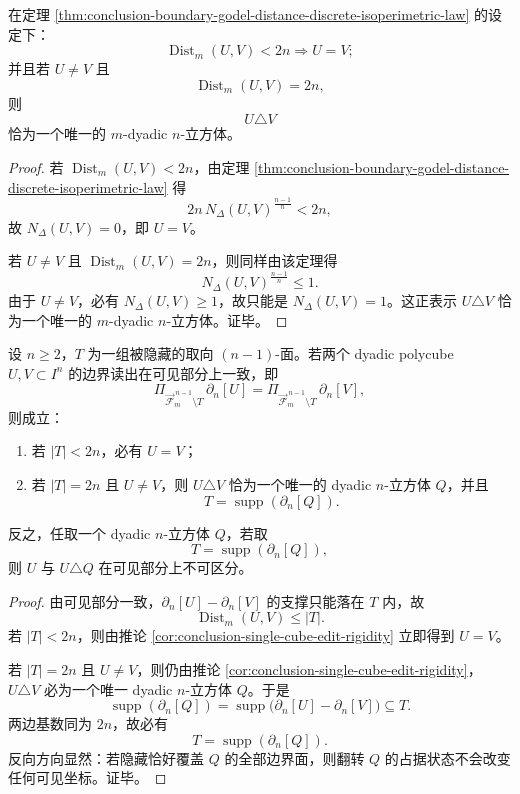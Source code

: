 \begin{corollary}[单立方体编辑刚性]\label{cor:conclusion-single-cube-edit-rigidity}
在定理 \ref{thm:conclusion-boundary-godel-distance-discrete-isoperimetric-law} 的设定下：
\[
\operatorname{Dist}_m(U,V)<2n \Longrightarrow U=V;
\]
并且若 \(U\neq V\) 且
\[
\operatorname{Dist}_m(U,V)=2n,
\]
则
\[
U\triangle V
\]
恰为一个唯一的 \(m\)-dyadic \(n\)-立方体。
\end{corollary}

\begin{proof}
若 \(\operatorname{Dist}_m(U,V)<2n\)，由定理 \ref{thm:conclusion-boundary-godel-distance-discrete-isoperimetric-law} 得
\[
2n\,N_\Delta(U,V)^{\frac{n-1}{n}}<2n,
\]
故 \(N_\Delta(U,V)=0\)，即 \(U=V\)。

若 \(U\neq V\) 且 \(\operatorname{Dist}_m(U,V)=2n\)，则同样由该定理得
\[
N_\Delta(U,V)^{\frac{n-1}{n}}\le 1.
\]
由于 \(U\neq V\)，必有 \(N_\Delta(U,V)\ge 1\)，故只能是 \(N_\Delta(U,V)=1\)。这正表示 \(U\triangle V\) 恰为一个唯一的 \(m\)-dyadic \(n\)-立方体。证毕。
\end{proof}

\begin{theorem}[隐藏面预算的尖锐阈值与极小障碍分类]\label{thm:conclusion-hidden-face-budget-sharp-threshold-classification}
设 \(n\ge 2\)，\(T\) 为一组被隐藏的取向 \((n-1)\)-面。若两个 dyadic polycube \(U,V\subset I^n\) 的边界读出在可见部分上一致，即
\[
\Pi_{\overrightarrow{\mathcal F}^{\,n-1}_m\setminus T}\,\partial_n[U]
=
\Pi_{\overrightarrow{\mathcal F}^{\,n-1}_m\setminus T}\,\partial_n[V],
\]
则成立：
\begin{enumerate}
  \item 若 \(|T|<2n\)，必有 \(U=V\)；
  \item 若 \(|T|=2n\) 且 \(U\neq V\)，则 \(U\triangle V\) 恰为一个唯一的 dyadic \(n\)-立方体 \(Q\)，并且
  \[
  T=\operatorname{supp}(\partial_n[Q]).
  \]
\end{enumerate}
反之，任取一个 dyadic \(n\)-立方体 \(Q\)，若取
\[
T=\operatorname{supp}(\partial_n[Q]),
\]
则 \(U\) 与 \(U\triangle Q\) 在可见部分上不可区分。
\end{theorem}

\begin{proof}
由可见部分一致，\(\partial_n[U]-\partial_n[V]\) 的支撑只能落在 \(T\) 内，故
\[
\operatorname{Dist}_m(U,V)\le |T|.
\]
若 \(|T|<2n\)，则由推论 \ref{cor:conclusion-single-cube-edit-rigidity} 立即得到 \(U=V\)。

若 \(|T|=2n\) 且 \(U\neq V\)，则仍由推论 \ref{cor:conclusion-single-cube-edit-rigidity}，\(U\triangle V\) 必为一个唯一 dyadic \(n\)-立方体 \(Q\)。于是
\[
\operatorname{supp}(\partial_n[Q])
=
\operatorname{supp}\bigl(\partial_n[U]-\partial_n[V]\bigr)
\subseteq T.
\]
两边基数同为 \(2n\)，故必有
\[
T=\operatorname{supp}(\partial_n[Q]).
\]
反向方向显然：若隐藏恰好覆盖 \(Q\) 的全部边界面，则翻转 \(Q\) 的占据状态不会改变任何可见坐标。证毕。
\end{proof}

